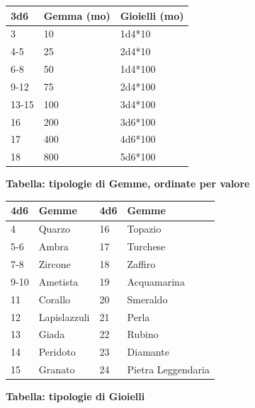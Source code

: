 \begin{multicols}{2}
{\noindent\begin{tabularx}{\linewidth}{Xl|l}
	\toprule
 \rowcolor{gray!20}\textbf{3d6}&\textbf{Gemma (mo)}&\textbf{Gioielli (mo)}\\
\toprule
	3&10& 1d4*10\\
 \rowcolor{gray!20}4-5&25& 2d4*10\\
	6-8&50& 1d4*100\\
 \rowcolor{gray!20}9-12&75& 2d4*100\\
	13-15&100& 3d4*100\\
 \rowcolor{gray!20}16&200& 3d6*100\\
	17&400& 4d6*100\\
 \rowcolor{gray!20}18&800& 5d6*100\\
\end{tabularx}

\medskip

\textbf{Tabella: tipologie di Gemme, ordinate per valore}

\noindent\begin{tabularx}{\linewidth}{l|l|l|l}
	\toprule
  \rowcolor{gray!20}\textbf{4d6} & \textbf{Gemme} & \textbf{4d6} & \textbf{Gemme} \\
\toprule
		4 & Quarzo & 16 &  Topazio\\
  \rowcolor{gray!20}5-6 & Ambra & 17 & Turchese \\
		7-8 & Zircone & 18 & Zaffiro \\
  \rowcolor{gray!20}9-10 & Ametista & 19 &  Acquamarina\\
		11 & Corallo & 20 & Smeraldo \\
  \rowcolor{gray!20}12 & Lapislazzuli & 21 & Perla \\
		13 & Giada & 22 & Rubino\\
  \rowcolor{gray!20}14 & Peridoto & 23 &  Diamante\\
		15 & Granato & 24 & Pietra Leggendaria\\
\end{tabularx}

\medskip

\textbf{Tabella: tipologie di Gioielli}

\medskip

}
\end{multicols}
